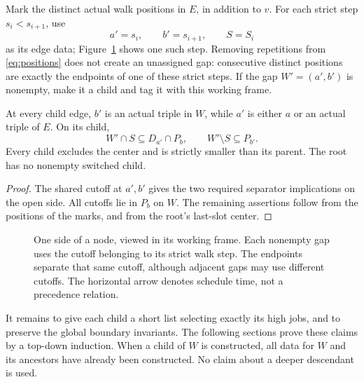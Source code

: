 Mark the distinct actual walk positions in \(E\), in addition to \(v\).
For each strict step \(s_i<s_{i+1}\), use
\begin{equation}
 a'=s_i,\qquad b'=s_{i+1},\qquad S=S_i
 \label{eq:edge-data}
\end{equation}
as its edge data; Figure~\ref{fig:shared-cutoff} shows one such step.
Removing repetitions from \eqref{eq:positions}
does not create an unassigned gap: consecutive distinct positions
are exactly the endpoints of one of these strict steps.
If the gap \(W'=(a',b')\) is nonempty, make it a child and tag it
with this working frame.

\begin{lemma}\label{lem:edge-labels}
At every child edge, \(b'\) is an actual triple in \(W\), while
\(a'\) is either \(a\) or an actual triple of \(E\). On its child,
\begin{equation}
 W'\cap S\subseteq D_{a'}\cap P_b,
 \qquad
 W'\setminus S\subseteq P_{b'}.
 \label{eq:edge-labels}
\end{equation}
Every child excludes the center and is strictly smaller than its parent.
The root has no nonempty switched child.
\end{lemma}
\begin{proof}
The shared cutoff at \(a',b'\) gives the two required separator
implications on the open side. All cutoffs lie in \(P_b\) on \(W\).
The remaining assertions follow from the positions of the marks,
and from the root's last-slot center.
\end{proof}

\begin{figure}[t]
\centering

\caption{One side of a node, viewed in its working frame.
Each nonempty gap uses the cutoff belonging to its strict walk step.
The endpoints separate that same cutoff, although adjacent gaps may
use different cutoffs. The horizontal arrow denotes schedule time,
not a precedence relation.}
\label{fig:shared-cutoff}
\end{figure}

It remains to give each child a short list selecting exactly
its high jobs, and to preserve the global boundary invariants.
The following sections prove these claims by a top-down induction.
When a child of \(W\) is constructed, all data for \(W\) and its
ancestors have already been constructed. No claim about a deeper
descendant is used.


